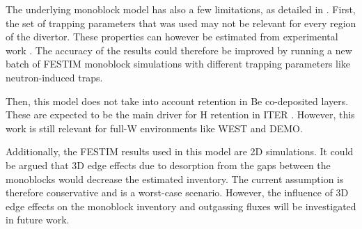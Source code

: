 The underlying monoblock model has also a few limitations, as detailed in \cite{delaporte-mathurin_parametric_2020}.
First, the set of trapping parameters that was used may not be relevant for every region of the divertor.
These properties can however be estimated from experimental work \cite{leblond_permeation_2021, delaporte-mathurin_parametric_2021}.
The accuracy of the results could therefore be improved by running a new batch of FESTIM monoblock simulations with different trapping parameters like neutron-induced traps.

Then, this model does not take into account retention in Be co-deposited layers.
These are expected to be the main driver for H retention in ITER \cite{de_temmerman_data_2021}.
However, this work is still relevant for full-W environments like WEST and DEMO.

Additionally, the FESTIM results used in this model are 2D simulations.
It could be argued that 3D edge effects due to desorption from the gaps between the monoblocks would decrease the estimated inventory.
The current assumption is therefore conservative and is a worst-case scenario.
However, the influence of 3D edge effects on the monoblock inventory and outgassing fluxes will be investigated in future work.

